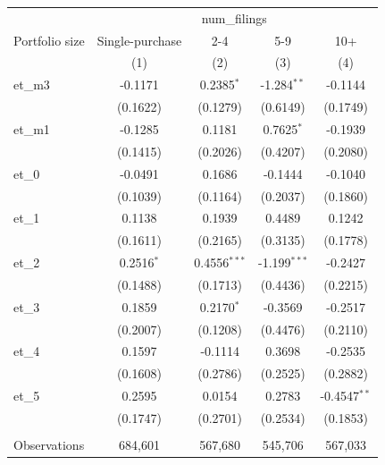 
\begingroup
\centering
\begin{tabular}{lcccc}
   \toprule
    & \multicolumn{4}{c}{num\_filings}\\
   Portfolio size      & Single-purchase & 2-4            & 5-9            & 10+ \\   
                       & (1)             & (2)            & (3)            & (4)\\  
   \midrule 
   et\_m3              & -0.1171         & 0.2385$^{*}$   & -1.284$^{**}$  & -0.1144\\   
                       & (0.1622)        & (0.1279)       & (0.6149)       & (0.1749)\\   
   et\_m1              & -0.1285         & 0.1181         & 0.7625$^{*}$   & -0.1939\\   
                       & (0.1415)        & (0.2026)       & (0.4207)       & (0.2080)\\   
   et\_0               & -0.0491         & 0.1686         & -0.1444        & -0.1040\\   
                       & (0.1039)        & (0.1164)       & (0.2037)       & (0.1860)\\   
   et\_1               & 0.1138          & 0.1939         & 0.4489         & 0.1242\\   
                       & (0.1611)        & (0.2165)       & (0.3135)       & (0.1778)\\   
   et\_2               & 0.2516$^{*}$    & 0.4556$^{***}$ & -1.199$^{***}$ & -0.2427\\   
                       & (0.1488)        & (0.1713)       & (0.4436)       & (0.2215)\\   
   et\_3               & 0.1859          & 0.2170$^{*}$   & -0.3569        & -0.2517\\   
                       & (0.2007)        & (0.1208)       & (0.4476)       & (0.2110)\\   
   et\_4               & 0.1597          & -0.1114        & 0.3698         & -0.2535\\   
                       & (0.1608)        & (0.2786)       & (0.2525)       & (0.2882)\\   
   et\_5               & 0.2595          & 0.0154         & 0.2783         & -0.4547$^{**}$\\   
                       & (0.1747)        & (0.2701)       & (0.2534)       & (0.1853)\\   
    \\
   Observations        & 684,601         & 567,680        & 545,706        & 567,033\\  

\end{tabular}

